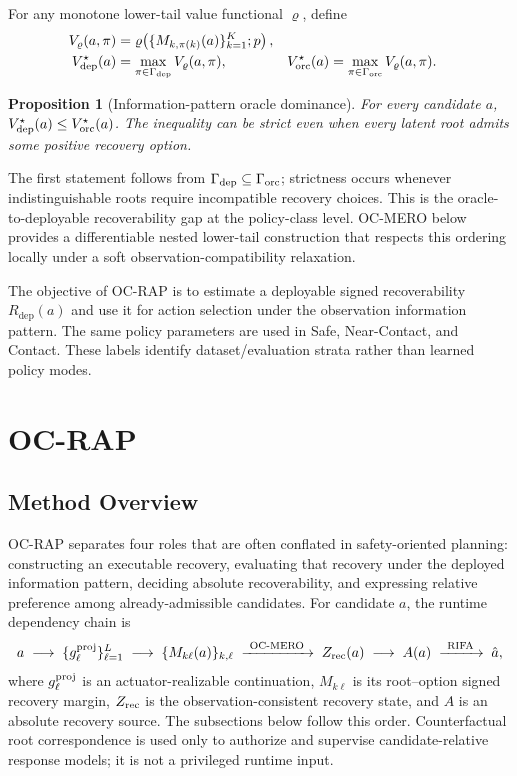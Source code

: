 \documentclass{article} %
\newcommand{\Rdep}{R_{\mathrm{dep}}}
\newtheorem{proposition}{Proposition}
\begin{document}
For any monotone lower-tail value functional $\varrho$, define
\begin{align}
 V_{\varrho}(a,\pi)
   &=\varrho\!\left(\{M_{k,\pi(k)}(a)\}_{k=1}^K;p\right),\\
 V^\star_{\rm dep}(a)
   &=\max_{\pi\in\Gamma_{\rm dep}}V_{\varrho}(a,\pi), &
 V^\star_{\rm orc}(a)
   &=\max_{\pi\in\Gamma_{\rm orc}}V_{\varrho}(a,\pi).
 \label{eq:policy_class_values}
\end{align}
\begin{proposition}[Information-pattern oracle dominance]
\label{prop:oracle_policy_class}
For every candidate $a$, $V^\star_{\rm dep}(a)\le V^\star_{\rm orc}(a)$. The inequality can be strict even when every latent root admits some positive recovery option.
\end{proposition}
The first statement follows from $\Gamma_{\rm dep}\subseteq\Gamma_{\rm orc}$; strictness occurs whenever indistinguishable roots require incompatible recovery choices. This is the oracle-to-deployable recoverability gap at the policy-class level. OC-MERO below provides a differentiable nested lower-tail construction that respects this ordering locally under a soft observation-compatibility relaxation.

The objective of OC-RAP is to estimate a deployable signed recoverability $\Rdep(a)$ and use it for action selection under the observation information pattern. The same policy parameters are used in Safe, Near-Contact, and Contact. These labels identify dataset/evaluation strata rather than learned policy modes.

\section{OC-RAP}
\label{sec:method}

\subsection{Method Overview}
\label{subsec:method_overview}

OC-RAP separates four roles that are often conflated in safety-oriented planning: constructing an executable recovery, evaluating that recovery under the deployed information pattern, deciding absolute recoverability, and expressing relative preference among already-admissible candidates. For candidate $a$, the runtime dependency chain is
\begin{equation}
 a
 \;\longrightarrow\;
 \{g_{\ell}^{\rm proj}\}_{\ell=1}^{L}
 \;\longrightarrow\;
 \{M_{k\ell}(a)\}_{k,\ell}
 \;\xrightarrow{\ \mathrm{OC\text{-}MERO}\ }\;
 Z_{\rm rec}(a)
 \;\longrightarrow\;
 A(a)
 \;\xrightarrow{\ \mathrm{RIFA}\ }\;
 \hat a,
 \label{eq:method_pipeline}
\end{equation}
where $g_{\ell}^{\rm proj}$ is an actuator-realizable continuation, $M_{k\ell}$ is its root--option signed recovery margin, $Z_{\rm rec}$ is the observation-consistent recovery state, and $A$ is an absolute recovery source. The subsections below follow this order. Counterfactual root correspondence is used only to authorize and supervise candidate-relative response models; it is not a privileged runtime input.
\end{document}
